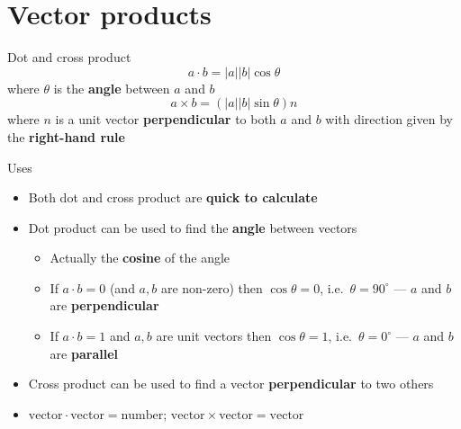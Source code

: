 \part{Vector products}
\frame{\partpage}

\begin{frame}{Dot and cross product}
	\pause $$a \cdot b = |a| |b| \cos \theta$$
	where $\theta$ is the \textbf{angle} between $a$ and $b$
	\vspace{2ex}
	\pause $$a \times b = (|a| |b| \sin \theta) n$$
	where $n$ is a unit vector \textbf{perpendicular} to both $a$ and $b$
	with direction given by the \textbf{right-hand rule}
\end{frame}

\begin{frame}{Uses}
	\begin{itemize}
		\pause\item Both dot and cross product are \textbf{quick to calculate}
		\pause\item Dot product can be used to find the \textbf{angle} between vectors
			\begin{itemize}
				\pause\item Actually the \textbf{cosine} of the angle
				\pause\item If $a \cdot b = 0$ (and $a,b$ are non-zero) then $\cos \theta = 0$, i.e.\ $\theta = 90^\circ$ --- $a$ and $b$ are \textbf{perpendicular}
				\pause\item If $a \cdot b = 1$ and $a,b$ are unit vectors then $\cos \theta = 1$, i.e.\ $\theta = 0^\circ$ --- $a$ and $b$ are \textbf{parallel}
			\end{itemize}
		\pause\item Cross product can be used to find a vector \textbf{perpendicular} to two others
		\pause\item $\text{vector} \cdot \text{vector} = \text{number}$; $\text{vector} \times \text{vector} = \text{vector}$
	\end{itemize}
\end{frame}


